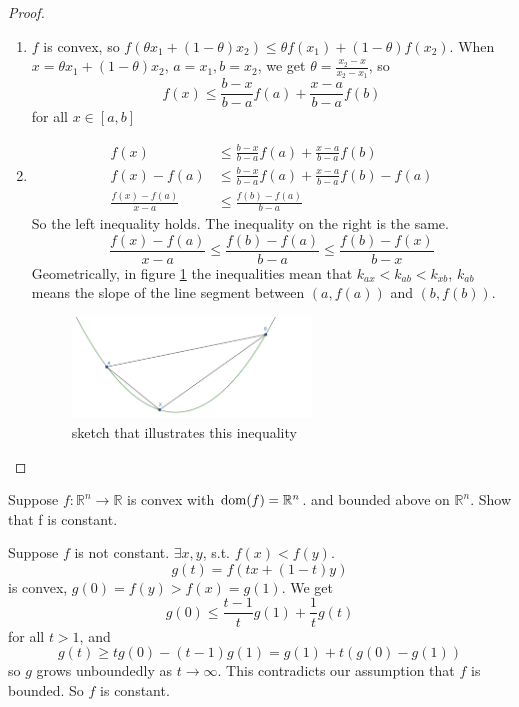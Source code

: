 \begin{problem}[3.1]
    \begin{proof}
        \text{}
        \begin{enumerate}
            \item $f$ is convex, so $f(\theta x_1 + (1 - \theta)x_2) \le \theta f(x_1) + (1 - \theta)f(x_2)$. When $x = \theta x_1 + (1 - \theta)x_2$, $a = x_1, b = x_2$, we get $\theta = \frac{x_2 - x}{x_2 - x_1}$, so \[f(x) \le \frac{b - x}{b - a}f(a) + \frac{x - a}{b - a}f(b)\] for all $x \in [a, b]$
            \item \begin{align*}
                f(x) &\le \frac{b - x}{b - a}f(a) + \frac{x - a}{b - a}f(b) \\
                f(x) - f(a) &\le \frac{b - x}{b - a}f(a) + \frac{x - a}{b - a}f(b) - f(a) \\
                \frac{f(x) - f(a)}{x - a} &\le \frac{f(b) - f(a)}{b - a}
            \end{align*}
            So the left inequality holds. The inequality on the right is the same.
            \[\frac{f(x) - f(a)}{x - a} \le \frac{f(b) - f(a)}{b - a} \le \frac{f(b) - f(x)}{b - x}\]
            Geometrically, in figure \ref{fig1} the inequalities mean that $k_{ax} < k_{ab} < k_{xb}$, $k_{ab}$ means the slope of the line segment between $(a, f(a))$ and $(b, f(b))$.
            \begin{figure}[htbp]
                \centering
                \includegraphics[width=0.6\textwidth]{./figure/fig1.png}
                \caption{sketch that illustrates this inequality \label{fig1}}
            \end{figure}
        \end{enumerate}
    \end{proof}
\end{problem}

\begin{problem}[3.7]
    Suppose $f : \mathbb{R}^n \to \mathbb{R}$ is convex with $\operatorname{dom}(f) = \mathbb{R}^n$. and bounded above on $\mathbb{R}^n$. Show that f is constant.

    \Answer Suppose $f$ is not constant. $\exists x, y$, s.t. $f(x) < f(y)$.
    \[g(t) = f(tx + (1 - t)y)\] is convex, $g(0) = f(y) > f(x) = g(1)$. We get
    \[g(0) \le \frac{t - 1}{t}g(1) + \frac{1}{t}g(t)\] for all $t > 1$, and
    \[g(t) \ge tg(0) - (t - 1)g(1) = g(1) + t(g(0) - g(1))\]
    so $g$ grows unboundedly as $t \to \infty$. This contradicts our assumption that $f$ is bounded. So $f$ is constant.
\end{problem}

